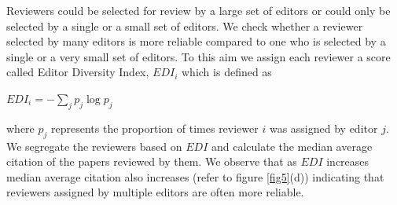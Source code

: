 Reviewers could be selected for review by a large set of editors or could only be selected by a single or a small set of editors. We check whether a reviewer selected by many editors is more reliable compared to one who is selected by a single or a very small set of editors. To this aim we assign each reviewer a score called Editor Diversity Index, $EDI_{i}$ which is defined as 

\begin{center}
$EDI_{i}=-\sum \limits_{j} p_{j}\log p_{j}$
\end{center}

where $p_{j}$ represents the proportion of times reviewer $i$ was assigned by editor $j$. We segregate the reviewers based on $EDI$ and calculate the median average citation of the papers reviewed by them. We observe that as $EDI$ increases median average citation also increases (refer to figure \ref{fig5}(d)) indicating that reviewers assigned by multiple editors are often more reliable.

